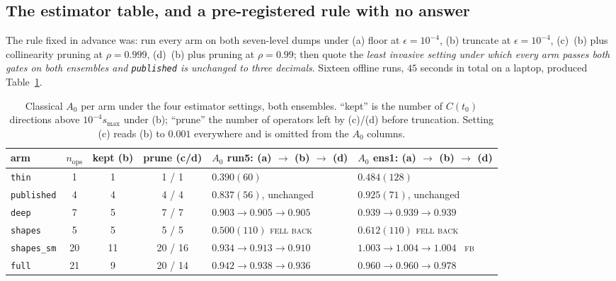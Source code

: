 \documentclass[11pt,a4paper]{article}
\newcommand{\Azero}{A_0}
\newcommand{\arm}[1]{\texttt{#1}}
\begin{document}
\subsection{The estimator table, and a pre-registered rule with no answer}
\label{sec:selection}

The rule fixed in advance was: run every arm on both seven-level dumps under
(a) floor at $\epsilon=10^{-4}$, (b) truncate at $\epsilon=10^{-4}$, (c)~(b)
plus collinearity pruning at $\rho = 0.999$, (d)~(b) plus pruning at
$\rho = 0.99$; then quote the \emph{least invasive setting under which every arm
passes both gates on both ensembles and \arm{published} is unchanged to three
decimals}. Sixteen offline runs, $45$ seconds in total on a laptop, produced
Table~\ref{tab:est}.

\begin{table}[htbp]
\centering\small
\caption{Classical $\Azero$ per arm under the four estimator settings, both
ensembles. ``kept'' is the number of $C(t_0)$ directions above
$10^{-4} s_{\max}$ under (b); ``prune'' the number of operators left by (c)/(d)
before truncation. Setting (c) reads (b) to $0.001$ everywhere and is omitted
from the $\Azero$ columns.}
\label{tab:est}
\begin{tabular}{@{}lcccll@{}}
\toprule
arm & $n_{\text{ops}}$ & kept (b) & prune (c/d)
    & $\Azero$ run5: (a) $\to$ (b) $\to$ (d)
    & $\Azero$ ens1: (a) $\to$ (b) $\to$ (d) \\
\midrule
\arm{thin}       & 1  & 1  & 1 / 1   & $0.390(60)$ & $0.484(128)$ \\
\arm{published}  & 4  & 4  & 4 / 4   & $0.837(56)$, unchanged & $0.925(71)$, unchanged \\
\arm{deep}       & 7  & 5  & 7 / 7   & $0.903 \to 0.905 \to 0.905$ & $0.939 \to 0.939 \to 0.939$ \\
\arm{shapes}     & 5  & 5  & 5 / 5   & $0.500(110)$ \quad \textsc{fell back} & $0.612(110)$ \quad \textsc{fell back} \\
\arm{shapes\_sm} & 20 & 11 & 20 / 16 & $0.934 \to 0.913 \to 0.910$ & $1.003 \to 1.004 \to 1.004$ \ \textsc{fb} \\
\arm{full}       & 21 & 9  & 20 / 14 & $0.942 \to 0.938 \to 0.936$ & $0.960 \to 0.960 \to 0.978$ \\
\bottomrule
\end{tabular}
\end{table}
\end{document}
